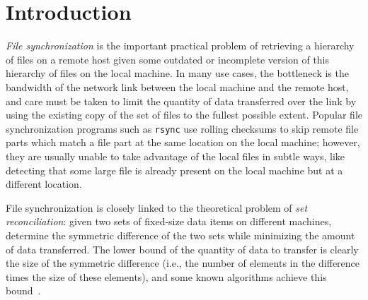 \documentclass[twoside,envcountsame,runningheads]{llncs}
\newcommand{\rsync}{\texttt{rsync}\xspace}
\begin{document}

\section{Introduction}

\emph{File synchronization} is the important practical problem of
retrieving a hierarchy of files on a remote host given some outdated or
incomplete version of this hierarchy of files on the local machine. In many use
cases, the bottleneck is the bandwidth of the network link between the local machine
and the remote host, and care must be taken to limit the quantity of data
transferred over the link by using the existing copy of the set of files to the
fullest possible extent. Popular file synchronization programs such as \rsync
use rolling checksums to skip remote file parts which match a file part at the
same location on the local machine; however, they are usually unable to take
advantage of the local files in subtle ways, like detecting that some large file
is already present on the local machine but at a different location.

File synchronization is closely linked to the theoretical problem of \emph{set
reconciliation}: given two sets of fixed-size data items on different machines,
determine the symmetric difference of the two sets while minimizing the amount
of data transferred. The lower bound of the quantity of data to transfer is
clearly the size of the symmetric difference (i.e., the number of elements in the
difference times the size of these elements), and some known algorithms achieve
this bound~\cite{Mins1}.
\end{document}
